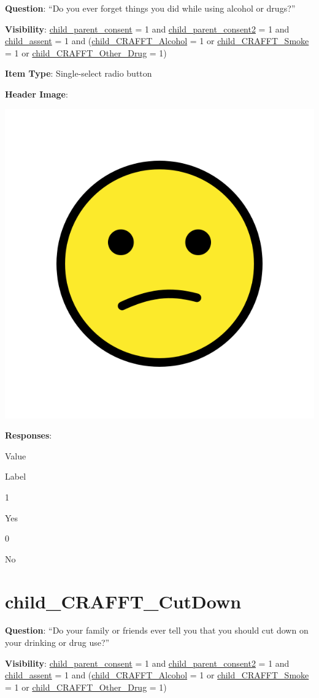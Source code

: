 \documentclass[]{book}
\begin{document}
\textbf{Question}: ``Do you ever forget things you did while using alcohol or drugs?''

\textbf{Visibility}: \protect\hyperlink{child_parent_consent}{child\_parent\_consent} = 1 and \protect\hyperlink{child_parent_consent2}{child\_parent\_consent2} = 1 and \protect\hyperlink{child_assent}{child\_assent} = 1 and (\protect\hyperlink{child_crafft_alcohol}{child\_CRAFFT\_Alcohol} = 1 or \protect\hyperlink{child_crafft_smoke}{child\_CRAFFT\_Smoke} = 1 or \protect\hyperlink{child_crafft_other_drug}{child\_CRAFFT\_Other\_Drug} = 1)

\textbf{Item Type}: Single-select radio button

\textbf{Header Image}:

\begin{flushleft}\includegraphics[width=0.33\linewidth]{downloadFigs4latex_HBN_PMHS_Codebook/child_CRAFFT_Forget_headerImg} \end{flushleft}

\textbf{Responses}:

Value

Label

1

Yes

0

No

\hypertarget{child_crafft_cutdown}{%
\section{child\_CRAFFT\_CutDown}\label{child_crafft_cutdown}}

\textbf{Question}: ``Do your family or friends ever tell you that you should cut down on your drinking or drug use?''

\textbf{Visibility}: \protect\hyperlink{child_parent_consent}{child\_parent\_consent} = 1 and \protect\hyperlink{child_parent_consent2}{child\_parent\_consent2} = 1 and \protect\hyperlink{child_assent}{child\_assent} = 1 and (\protect\hyperlink{child_crafft_alcohol}{child\_CRAFFT\_Alcohol} = 1 or \protect\hyperlink{child_crafft_smoke}{child\_CRAFFT\_Smoke} = 1 or \protect\hyperlink{child_crafft_other_drug}{child\_CRAFFT\_Other\_Drug} = 1)
\end{document}
